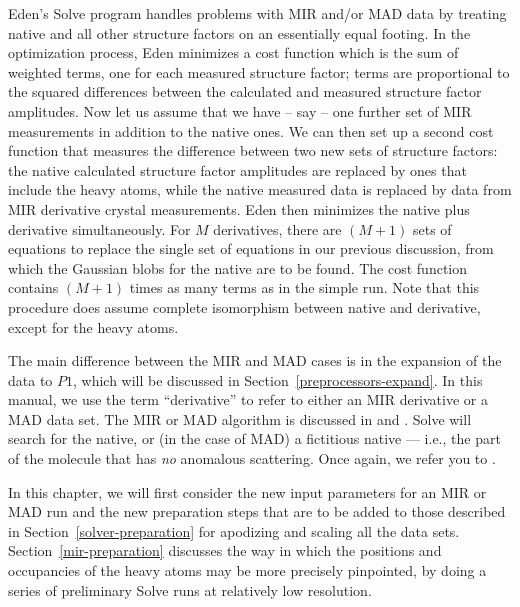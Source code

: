 \documentclass{report}
\begin{document}
Eden's Solve program handles problems with MIR and/or MAD data by treating 
native and all other structure factors on an essentially equal footing.
In the optimization process, Eden minimizes a
cost function which is the sum of weighted terms, one for each
measured structure factor; terms are proportional to the squared differences 
between the calculated and measured structure factor amplitudes. 
Now let us assume that we have -- say -- one further set of MIR measurements in
addition to the native ones.  We can then set up a second cost function that
measures the difference between two new sets of structure factors:  
the native calculated structure factor amplitudes are replaced by ones that 
include the heavy atoms, while the native measured data is replaced by data
from MIR derivative crystal measurements.  Eden then minimizes the native plus
derivative simultaneously.  For $M$
derivatives, there are $(M+1)$ sets of equations to replace the single
set of equations in our previous discussion, from which the Gaussian blobs
for the native are to be found.
The cost function contains $(M+1)$ times as many terms as in the simple run.
Note that this procedure does assume complete
isomorphism between native and derivative, except for the heavy atoms.

\vspace {0.1in}

The main difference between the MIR and MAD cases is in the expansion of the
data to $P1$, which will be discussed in Section~\ref{preprocessors-expand}.  
In this manual, we use the term ``derivative'' to refer to either an MIR
derivative or a MAD data set.  
The MIR or MAD algorithm is discussed in \cite{eden4} and \cite{eden5}.  
Solve will search for the native, or (in the case of MAD) a fictitious 
native --- i.e., the part of the molecule that has {\em no} 
anomalous scattering.  Once again, we refer you to \cite{eden5}.

\vspace {0.1in}

In this chapter, we will first consider the new input parameters for an MIR or
MAD run and the new preparation steps that are to be added to those described 
in Section~\ref{solver-preparation} for apodizing and 
scaling all the data sets.  Section~\ref{mir-preparation} discusses the way
in which the positions and occupancies of the heavy atoms may be more
precisely pinpointed, by doing a series of preliminary Solve runs at 
relatively low resolution.  

\vspace {0.1in}
\end{document}
